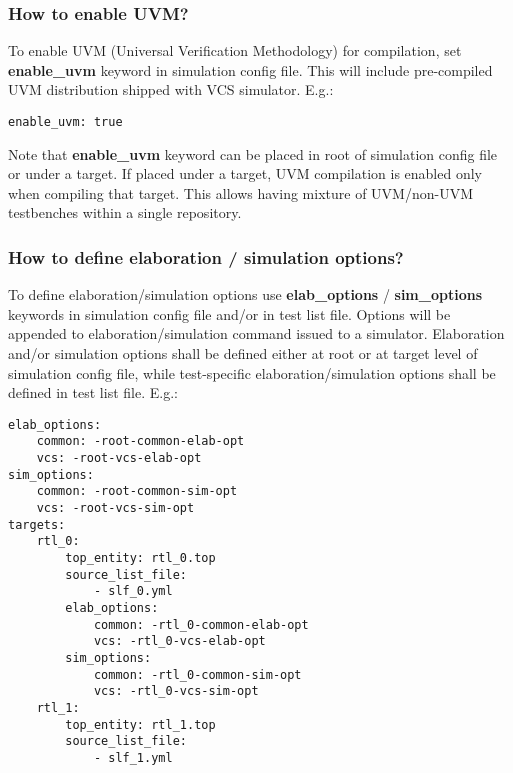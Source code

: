 \documentclass{tropic_design_spec}
\begin{document}
\subsubsection{How to enable UVM?}
\label{sec:how-to-enable-uvm}

To enable UVM (Universal Verification Methodology) for compilation, set \textbf{enable_uvm}
keyword in simulation config file. This will include pre-compiled UVM distribution shipped
with VCS simulator. E.g.:

\begin{lstlisting}
enable_uvm: true
\end{lstlisting}

Note that \textbf{enable_uvm} keyword can be placed in root of simulation config file
or under a target. If placed under a target, UVM compilation is enabled only when
compiling that target. This allows having mixture of UVM/non-UVM testbenches within a
single repository.


\subsubsection{How to define elaboration / simulation options?}
\label{sec:how-to-define-elaboration-simulation-options}

To define elaboration/simulation options use \textbf{elab_options} / \textbf{sim_options}
keywords in simulation config file and/or in test list file. Options will
be appended to elaboration/simulation command issued to a simulator.
Elaboration and/or simulation options shall be defined either at root or at target
level of simulation config file, while test-specific elaboration/simulation options
shall be defined in test list file.
E.g.:

\begin{lstlisting}
elab_options:
    common: -root-common-elab-opt
    vcs: -root-vcs-elab-opt
sim_options:
    common: -root-common-sim-opt
    vcs: -root-vcs-sim-opt
targets:
    rtl_0:
        top_entity: rtl_0.top
        source_list_file:
            - slf_0.yml
        elab_options:
            common: -rtl_0-common-elab-opt
            vcs: -rtl_0-vcs-elab-opt
        sim_options:
            common: -rtl_0-common-sim-opt
            vcs: -rtl_0-vcs-sim-opt
    rtl_1:
        top_entity: rtl_1.top
        source_list_file:
            - slf_1.yml
\end{lstlisting}
\end{document}
